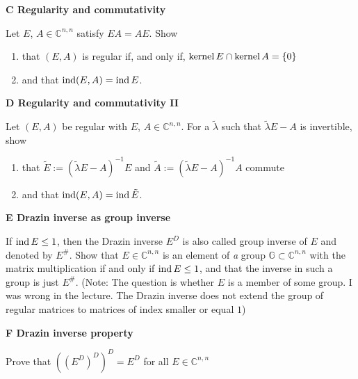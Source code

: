 \documentclass[a4paper,10pt]{article}
\begin{document}
\smallskip

{\bf C Regularity and commutativity}

Let $E$, $A\in \mathbb C^{n,n}$ satisfy $EA=AE$. Show
\begin{enumerate}
	\item that $(E, A)$ is regular if, and only if, $\operatorname{kernel} E \cap \operatorname{kernel} A = \{0\}$
	\item and that $\operatorname{ind} (E,A) = \operatorname{ind} E$.
\end{enumerate}
\smallskip

{\bf D Regularity and commutativity II}

Let $(E,A)$ be regular with $E$, $A\in \mathbb C^{n,n}$. For a $\tilde \lambda$ such that $\tilde \lambda E - A$ is invertible, show
\begin{enumerate}
	\item that $\tilde E := (\tilde \lambda E - A)^{-1}E$ and $\tilde A := (\tilde \lambda E - A)^{-1}A$ commute
	\item and that $\operatorname{ind} (E, A) = \operatorname{ind} \tilde E$.
\end{enumerate}
\smallskip

{\bf E Drazin inverse as group inverse}

If $\operatorname{ind} E \leq 1$, then the Drazin inverse $E^D$ is also called group inverse of $E$ and denoted by $E^\#$. Show that $E \in \mathbb C^{n,n}$ is an element of \emph{a} group $\mathbb G \subset \mathbb C^{n,n}$ with the matrix multiplication if and only if $\operatorname{ind} E \leq 1$, and that the inverse in such a group is just $E^\#$. (Note: The question is whether $E$ is a member of some group. I was wrong in the lecture. The Drazin inverse does not extend the group of regular matrices to matrices of index smaller or equal $1$)
\smallskip

{\bf F Drazin inverse property}

Prove that $( ( E^D)^D)^D=E^D$ for all $E\in \mathbb C^{n,n}$ 
\end{document}
